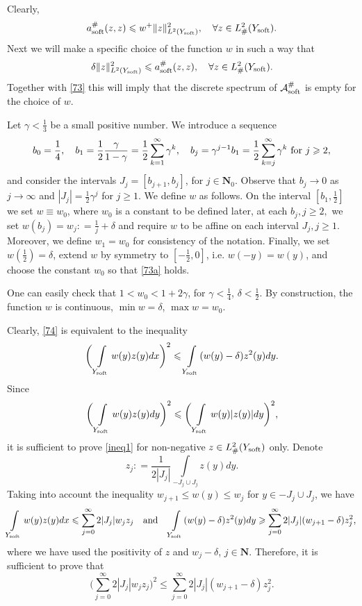 \documentclass[11pt]{article}
\newcommand\soft{{\rm soft}}
\def\AA{\mathcal{A}}
\newcommand\N{\mathbf{N}}
\theoremstyle{remark}
\begin{document}
Clearly,
\begin{equation}\label{73}
	a_\soft^\#( z,z )\leqslant w^+ \|z\|^2_{L^2(Y_\soft)}, \quad \forall z\in L^2_\#(Y_\soft).
\end{equation}
Next we will make a specific choice of the function $w$ in such a way that
\begin{equation}\label{74}
	\delta\|z\|^2_{L^2(Y_\soft)}\leqslant a_\soft^\#( z,z ), \quad \forall z\in L^2_\#(Y_\soft).
\end{equation}
Together with \eqref{73} this will imply that the discrete spectrum of  $\AA_\soft^\# $ is empty for the choice of $w$.

Let $\gamma < \frac{1}{3}$ be a small positive number. We introduce a sequence
$$
b_0=\frac14,\quad b_1=\frac12\frac{\gamma}{1-\gamma}=\frac12\sum_{k=1}^{\infty}\gamma^k, \quad
b_j=\gamma^{j-1} b_1 = \frac12\sum_{k=j}^{\infty}\gamma^k\ \hbox{for }j\geqslant 2,
$$
and consider the intervals $J_j=[b_{j+1},b_j] $, for $j \in \mathbf{N}_0$. Observe that  $b_j\to 0$ as $j\to\infty$ and $|J_j|=\frac12\gamma^j$ for $j\geqslant 1$.
We define $w$ as follows. On the interval $[b_1,\frac12]$ we set $w \equiv w_0$, where $w_0$ is a constant to be defined later, at each $b_j, j\geq 2,$ we set $w(b_j ) = w_j : = \frac{1}{j }+\delta$ and require $w$ to be affine on each interval $J_j, j\geq 1$. Moreover, we define $w_1=w_0$ for consistency of the notation. Finally,
we set $w(\frac12)=\delta$, extend $w$ by symmetry to $[-\frac12,0]$, i.e. $w(-y)=w(y)$, and choose the constant $w_0$ so that \eqref{73a} holds.

One can easily check that  $1<w_0<1+2\gamma$, for $\gamma<\frac14$, $\delta<\frac12$.
By construction, the function $w$ is continuous, $\min w=\delta$, $\max w=w_0$.

Clearly, \eqref{74}
is equivalent to the inequality
\begin{equation}\label{ineq1}
	\bigg(\int\limits_{Y_\soft } w(y)z(y)dx\bigg)^2\leqslant \int\limits_{Y_\soft } (w(y)-\delta) z^2(y)dy.
\end{equation}
  Since
$$
\bigg(\int\limits_{Y_\soft } w(y)z(y)dy\bigg)^2\leqslant \bigg(\int\limits_{Y_\soft } w(y)|z(y)|dy\bigg)^2,
$$
it is sufficient to prove \eqref{ineq1} for non-negative $z\in L^2_\#(Y_\soft)$ only.
Denote
$$
 z_j: =\frac 1{2|J_j|}\int\limits_{-J_j\cup J_j}z(y)dy.
$$
Taking into account the inequality $w_{j+1}\leqslant w(y)\leqslant w_j $ for $y\in -J_j\cup J_j$, we have
$$
\int\limits_{Y_\soft } w(y)z(y)dx\leqslant \sum_{j=0}^{\infty}2|J_j|w_j z_j \quad\hbox{and}\quad\int\limits_{Y_\soft } (w(y)-\delta) z^2(y)dy
\geqslant  \sum_{j=0}^{\infty}2 |J_j|(w_{j+1}-\delta)
 z_j^2,
$$
where we have used the positivity of $z$ and $w_j-\delta$, $j\in \N$.   Therefore, it is sufficient to prove that
\begin{equation}\label{ineq2}
	\Big(\sum_{j=0}^{\infty}2|J_j|w_j z_j\Big)^2\leqslant \sum_{j=0}^{\infty}2 |J_j|(w_{j+1}-\delta)  z_j^2.
\end{equation}
\end{document}
